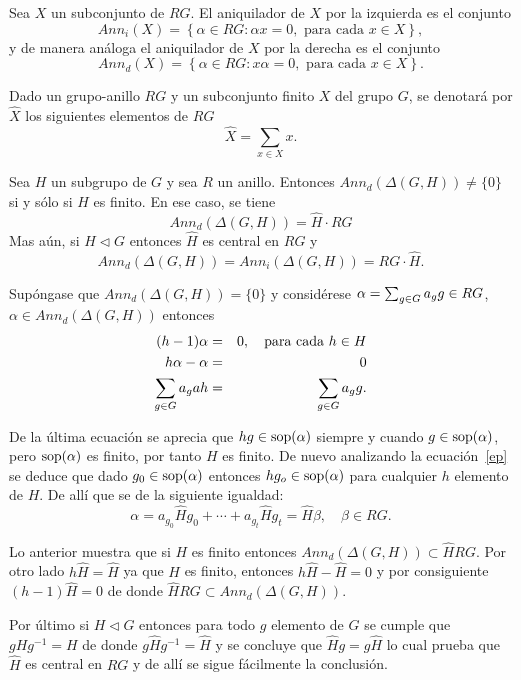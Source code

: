 \begin{definicion}
Sea $X$ un subconjunto de $RG$. El aniquilador de $X$ por la izquierda es el conjunto
\[ Ann_{i}(X) = \left\{ \alpha \in RG : \alpha x = 0, \mbox{ para cada } x \in X \right\},\]
y de manera análoga el aniquilador de $X$ por la derecha es el conjunto
\[ Ann_{d}(X) = \left\{ \alpha \in RG : x\alpha  = 0, \mbox{ para cada } x \in X \right\}.\]

\end{definicion}

\begin{definicion}
Dado un grupo-anillo $RG$ y un subconjunto finito $X$ del grupo $G$, se denotará por $\hat{X}$ los siguientes elementos de $RG$
\[\hat{X} = \sum_{x \in X}x.\] 
\end{definicion}

\begin{lema}
Sea $H$ un subgrupo de $G$ y sea $R$ un anillo. Entonces $Ann_{d}(\Delta(G,H)) \neq \{ 0\}$ si y sólo si $H$ es finito. En ese caso, se tiene
$$Ann_d(\Delta(G,H)) = \hat{H} \cdot RG $$
Mas aún, si $H \lhd G$ entonces $\hat{H}$ es central en $RG$ y 
\[Ann_d(\Delta(G,H)) = Ann_i(\Delta(G,H)) = RG \cdot \hat{H}.\]
\end{lema}
\begin{proof*}
Supóngase que $Ann_d(\Delta(G,H)) = \{ 0\}$ y considérese $\alpha = \sum_{g \in G} a_{g} g \in RG$, $\alpha \in Ann_d(\Delta(G,H))$ entonces
\begin{eqnarray}
(h-1)\alpha &=& 0,  \quad \mbox{para cada } h \in H  \nonumber \\
h\alpha -\alpha &=&  0 \nonumber  \\
\sum_{g \in G} a_gah &=& \sum_{g \in G} a_{g} g. \label{ep}
\end{eqnarray}

De la última ecuación se aprecia que $hg \in \operatorname{sop}(\alpha)$ siempre y cuando $g \in \operatorname{sop}(\alpha)$, pero $\operatorname{sop}(\alpha)$ es finito, por tanto $H$ es finito.
De nuevo analizando la ecuación~\eqref{ep} se deduce que dado $g_0 \in \operatorname{sop}(\alpha)$ entonces $hg_o \in \operatorname{sop}(\alpha)$ para cualquier $h$ elemento de $H$. De allí que se de la siguiente igualdad:
\[ \alpha = a_{g_0}\hat{H}g_0 + \cdots + a_{g_t}\hat{H}g_t = \hat{H}\beta, \quad \beta \in RG. \]

Lo anterior muestra que si $H$ es finito entonces $Ann_d(\Delta(G,H))\subset \hat{H}RG$. Por otro lado $h\hat{H} = \hat{H}$ ya que $H$ es finito, entonces $h\hat{H} -\hat{H} = 0$ y por consiguiente $(h-1)\hat{H} = 0$ de donde $\hat{H}RG \subset Ann_d(\Delta(G,H))$.

Por último si $H \lhd G$ entonces para todo $g$ elemento de $G$ se cumple que $gHg^{-1} = H$ de donde $g\hat{H}g^{-1} = \hat{H}$ y se concluye que $\hat{H}g = g\hat{H}$ lo cual prueba que $\hat{H}$ es central en $RG$ y de allí se sigue fácilmente la conclusión. \qedhere
\end{proof*}

